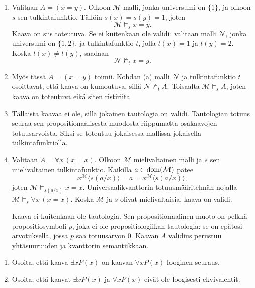 \documentclass[11pt,a4paper]{amsart}
\begin{document}
\begin{solution}
  \leavevmode\par
  \begin{enumerate}[label=(\alph*)]
    \item Valitaan \(A=(x=y)\). Olkoon \(\mathcal M\) malli, jonka
      universumi on \(\{1\}\), ja olkoon \(s\) sen tulkintafunktio.
      Tällöin \(s(x)=s(y)=1\), joten
      \[
        \mathcal M\models_s x=y.
      \]
      Kaava on siis toteutuva. Se ei kuitenkaan ole validi:
      valitaan malli \(\mathcal N\), jonka universumi on \(\{1,2\}\),
      ja tulkintafunktio \(t\), jolla \(t(x)=1\) ja \(t(y)=2\).
      Koska \(t(x)\ne t(y)\), saadaan
      \[
        \mathcal N\not\models_t x=y.
      \]

    \item Myös tässä \(A=(x=y)\) toimii. Kohdan (a) malli
      \(\mathcal N\) ja tulkintafunktio \(t\) osoittavat, että kaava
      on kumoutuva, sillä \(\mathcal N\not\models_t A\).
      Toisaalta \(\mathcal M\models_s A\), joten kaava on toteutuva
      eikä siten ristiriita.

    \item Tällaista kaavaa ei ole, sillä jokainen tautologia on
      validi. Tautologian totuus seuraa sen propositionaalisesta
      muodosta riippumatta osakaavojen totuusarvoista. Siksi se
      toteutuu jokaisessa mallissa jokaisella tulkintafunktiolla.

    \item Valitaan \(A=\forall x\,(x=x)\). Olkoon \(\mathcal M\)
      mielivaltainen malli ja \(s\) sen mielivaltainen
      tulkintafunktio. Kaikilla \(a\in\operatorname{dom}(\mathcal M)\) pätee
      \[
        x^{\mathcal M}\langle s(a/x)\rangle
        =a
        =x^{\mathcal M}\langle s(a/x)\rangle,
      \]
      joten \(\mathcal M\models_{s(a/x)}x=x\).
      Universaalikvanttorin totuusmääritelmän nojalla
      \(\mathcal M\models_s\forall x\,(x=x)\).
      Koska \(\mathcal M\) ja \(s\) olivat mielivaltaisia,
      kaava on validi.

      Kaava ei kuitenkaan ole tautologia. Sen propositionaalinen
      muoto on pelkkä propositiosymboli \(p\), joka ei ole
      propositiologiikan tautologia: se on epätosi arvotuksella,
      jossa \(p\) saa totuusarvon \(0\). Kaavan \(A\) validius
      perustuu yhtäsuuruuden ja kvanttorin semantiikkaan.\qedhere
  \end{enumerate}
\end{solution}

\begin{exercise}
  \leavevmode
  \begin{enumerate}[label=(\alph*)]
    \item Osoita, että kaava \(\exists x P(x)\) on kaavan \(\forall x P(x)\)
      looginen seuraus.
    \item Osoita, että kaavat \(\exists x P(x)\) ja \(\forall x P(x)\) eivät ole
      loogisesti ekvivalentit.
  \end{enumerate}
\end{exercise}
\end{document}
